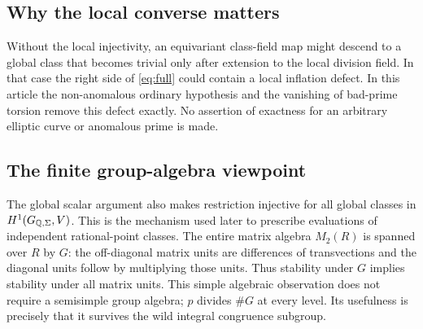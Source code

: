 \documentclass[11pt,a4paper]{article}
\theoremstyle{definition}\newtheorem{definition}[theorem]{Definition}
\theoremstyle{remark}\newtheorem{remark}[theorem]{Remark}
\numberwithin{equation}{section}
\begin{document}
\subsection*{Why the local converse matters}
Without the local injectivity, an equivariant class-field map might descend to a global class that becomes trivial only after extension to the local division field. In that case the right side of \eqref{eq:full} could contain a local inflation defect. In this article the non-anomalous ordinary hypothesis and the vanishing of bad-prime torsion remove this defect exactly. No assertion of exactness for an arbitrary elliptic curve or anomalous prime is made.

\subsection*{The finite group-algebra viewpoint}
The global scalar argument also makes restriction injective for all global classes in $H^1(G_{\mathbb Q,\Sigma},V)$. This is the mechanism used later to prescribe evaluations of independent rational-point classes. The entire matrix algebra $M_2(R)$ is spanned over $R$ by $G$: the off-diagonal matrix units are differences of transvections and the diagonal units follow by multiplying those units. Thus stability under $G$ implies stability under all matrix units. This simple algebraic observation does not require a semisimple group algebra; $p$ divides $\#G$ at every level. Its usefulness is precisely that it survives the wild integral congruence subgroup.
\end{document}

